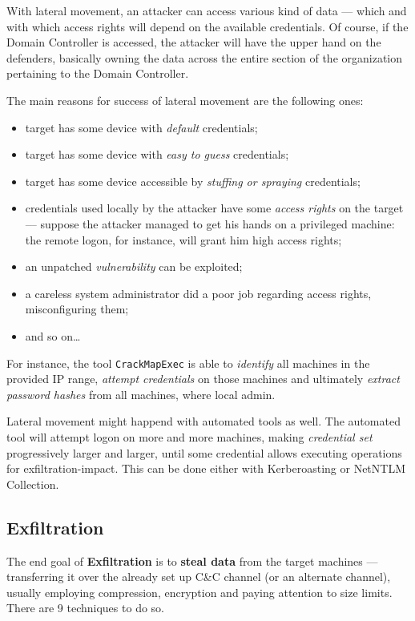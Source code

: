 \documentclass[10pt]{\classname}
\begin{document}
With lateral movement, an attacker can access various kind of data --- which and
with which access rights will depend on the available credentials. Of course,
if the Domain Controller is accessed, the attacker will have the upper hand on
the defenders, basically owning the data across the entire section of the organization pertaining to the Domain Controller.

The main reasons for success of lateral movement are the following ones:
\begin{itemize}
    \item target has some device with \emph{default} credentials;
    \item target has some device with \emph{easy to guess} credentials;
    \item target has some device accessible by \emph{stuffing or spraying} credentials;
    \item credentials used locally by the attacker have some \emph{access
        rights} on the target --- suppose the attacker managed to get his hands
        on a privileged machine: the remote logon, for instance, will grant him
        high access rights;
    \item an unpatched \emph{vulnerability} can be exploited;
    \item a careless system administrator did a poor job regarding access
        rights, misconfiguring them;
    \item and so on\dots
\end{itemize}

For instance, the tool \texttt{CrackMapExec} is able to \emph{identify} all
machines in the provided IP range, \emph{attempt credentials} on those machines
and ultimately \emph{extract password hashes} from all machines, where local
admin.

Lateral movement might happend with automated tools as well. The automated tool
will attempt logon on more and more machines, making \emph{credential set}
progressively larger and larger, until some credential allows executing
operations for exfiltration\--impact. This can be done either with
Kerberoasting or NetNTLM Collection.


\subsection{Exfiltration}

The end goal of \textbf{Exfiltration} is to \textbf{steal data} from the target
machines --- transferring it over the already set up C\&C channel (or an
alternate channel), usually employing compression, encryption and paying
attention to size limits. There are 9 techniques to do so.
\end{document}
